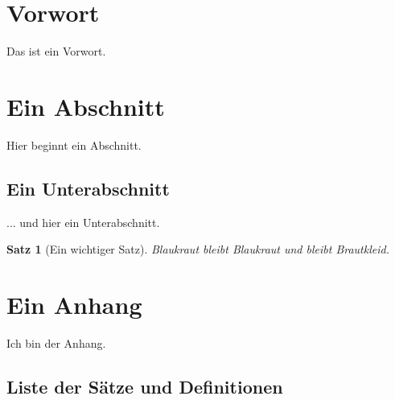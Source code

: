 \newcommand{\verfasser}{Phil Steinhorst}					%
\newcommand{\fach}{Ein Skript}								%
\newcommand{\shortFach}{Skript}								%
\newcommand{\prof}{Prof.\,Dr.\,Schlotze}					%
\newcommand{\untertitel}{gelesen von \prof}					%
\newcommand{\semester}{Sommersemester 2014}					%
\newcommand{\homepage}{http://keen.bplaced.net/augenkrebs/augenkrebs.htm}	%

\setcounter{tocdepth}{2}				%

\newtheorem{satz}[tcount]{Satz}
\newtheorem{bsp}[tcount]{Beispiel}


\section*{Vorwort}
	Das ist ein Vorwort.
\newpage
	
\tableofcontents											%
\newpage

\section{Ein Abschnitt}
	Hier beginnt ein Abschnitt.
	
\subsection{Ein Unterabschnitt}
	... und hier ein Unterabschnitt.
	
\begin{satz}[Ein wichtiger Satz]
	Blaukraut bleibt Blaukraut und  bleibt Brautkleid. 
\end{satz}

\newpage
\appendix							%

\section{Ein Anhang}
	Ich bin der Anhang.

\printindex							%
\subsection*{Liste der Sätze und Definitionen}
